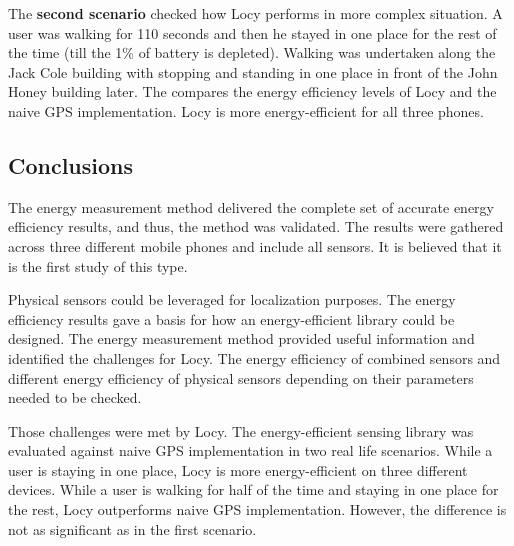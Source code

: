 The \textbf{second scenario} checked how Locy performs in more complex situation. A user was walking for 110 seconds and then he stayed in one place for the rest of the time (till the 1\% of battery is depleted). Walking was undertaken along the Jack Cole building with stopping and standing in one place in front of the John Honey building later. The  compares the energy efficiency levels of Locy and the naive GPS implementation. Locy is more energy-efficient for all three phones. 
	

\subsection{Conclusions}
\hspace{10pt} The energy measurement method delivered the complete set of accurate energy efficiency results, and thus, the method was validated. The results were gathered across three different mobile phones and include all sensors. It is believed that it is the first study of this type. 

Physical sensors could be leveraged for localization purposes. The energy efficiency results gave a basis for how an energy-efficient library could be designed. The energy measurement method provided useful information and identified the challenges for Locy. The energy efficiency of combined sensors and different energy efficiency of physical sensors depending on their parameters needed to be checked. 

Those challenges were met by Locy. The energy-efficient sensing library was evaluated against naive GPS  implementation in two real life scenarios. While a user is staying in one place, Locy is more energy-efficient on three different devices. While a user is walking for half of the time and staying in one place for the rest, Locy outperforms naive GPS implementation. However, the difference is not as significant as in the first scenario.